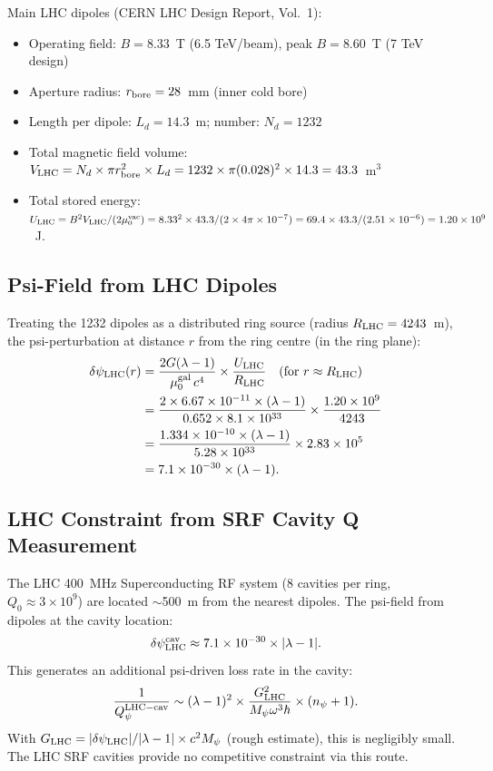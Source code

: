 \documentclass[11pt,twocolumn]{article}
\newcommand{\dpsi}{\delta\psi}
\newcommand{\lam}{\lambda}
\newcommand{\Mpsi}{M_\psi}
\begin{document}
Main LHC dipoles (CERN LHC Design Report, Vol.~1):
\begin{itemize}[nosep]
\item Operating field: $B = 8.33$~T (6.5 TeV/beam), peak $B = 8.60$~T (7 TeV design)
\item Aperture radius: $r_{\rm bore} = 28$~mm (inner cold bore)
\item Length per dipole: $L_d = 14.3$~m; number: $N_d = 1232$
\item Total magnetic field volume: $V_{\rm LHC} = N_d\times\pi r_{\rm bore}^2\times L_d
= 1232\times\pi(0.028)^2\times14.3 = 43.3$~m$^3$
\item Total stored energy: $U_{\rm LHC} = B^2 V_{\rm LHC}/(2\mu_0^{\rm vac})
= 8.33^2\times43.3/(2\times4\pi\times10^{-7})
= 69.4\times43.3/(2.51\times10^{-6}) = 1.20\times10^9$~J.
\end{itemize}

\subsection{Psi-Field from LHC Dipoles}

Treating the 1232 dipoles as a distributed ring source (radius
$R_{\rm LHC} = 4243$~m), the psi-perturbation at distance $r$ from the
ring centre (in the ring plane):
\begin{align}
\dpsi_{\rm LHC}(r) &= \frac{2G(\lam-1)}{\mu_0^{\rm gal}\,c^4}
\times\frac{U_{\rm LHC}}{R_{\rm LHC}}
\quad\text{(for }r \approx R_{\rm LHC}\text{)}
\nonumber\\
&= \frac{2\times6.67\times10^{-11}\times(\lam-1)}
{0.652\times8.1\times10^{33}}
\times\frac{1.20\times10^9}{4243}
\nonumber\\
&= \frac{1.334\times10^{-10}\times(\lam-1)}{5.28\times10^{33}}
\times2.83\times10^5
\nonumber\\
&= 7.1\times10^{-30}\times(\lam-1).
\label{eq:dpsi_lhc}
\end{align}

\subsection{LHC Constraint from SRF Cavity Q Measurement}

The LHC 400~MHz Superconducting RF system (8 cavities per ring, $Q_0 \approx 3\times10^9$)
are located $\sim$500~m from the nearest dipoles. The psi-field from
dipoles at the cavity location:
\begin{equation}
\dpsi_{\rm LHC}^{\rm cav} \approx 7.1\times10^{-30}\times|\lam-1|.
\end{equation}
This generates an additional psi-driven loss rate in the cavity:
\begin{equation}
\frac{1}{Q_\psi^{\rm LHC-cav}} \sim (\lam-1)^2 \times
\frac{G_{\rm LHC}^2}{\Mpsi\omega^3\hbar}\times(n_\psi+1).
\end{equation}
With $G_{\rm LHC} = |\dpsi_{\rm LHC}|/|\lam-1|\times c^2\Mpsi$ (rough estimate),
this is negligibly small. The LHC SRF cavities provide no competitive
constraint via this route.
\end{document}
